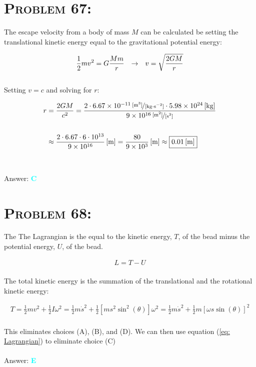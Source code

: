 \documentclass{article}
\providecommand{\e}[1]{\ensuremath{\times 10^{#1}}}
\begin{document}

\section{\textsc{Problem 67:}} The escape velocity from a body of mass $M$ can be calculated be setting the translational kinetic energy equal to the gravitational potential energy:

\begin{gather}
\frac{1}{2} m v^{2} = G \frac{Mm}{r} \hspace{.1in} \rightarrow \hspace{.1in} v = \sqrt{\frac{2GM}{r}}
\end{gather}
\\
Setting $v = c$ and solving for $r$:

\begin{align}
r &=  \frac{2GM}{c^{2}} = \frac{   2 \cdot \unitfrac[6.67\e{-11}]{[m^{3}]}{[kg \cdot s^{-2}]} \cdot \unit[5.98\e{24}]{[kg]} }{  \unitfrac[9\e{16}]{[m^{2}]}{[s^{2}]}   } \nonumber\\
\nonumber\\
&\approx \unit[  \frac{2 \cdot 6.67 \cdot 6 \cdot 10^{13}} {9\e{16}} ]  {[m]} = \unit[ \frac{80}{9\e{3}}   ]{[m]} \approx \boxed{\unit[  0.01  ]{[m]}}\nonumber
\end{align}
\\\\
Answer: \textbf{\textcolor{cyan}C}\\


\section{\textsc{Problem 68:}} The The Lagrangian is the equal to the kinetic energy, $T$, of the bead minus the potential energy, $U$, of the bead. 

\begin{gather}
\label {eq: Lagrangian}L = T-U
\end{gather}
\\
The total kinetic energy is the summation of the translational and the rotational kinetic energy:

\begin{gather}
T = \frac{1}{2}mv^{2} + \frac{1}{2}I \omega^{2} = \frac{1}{2}m \dot{s}^{2} + \frac{1}{2} \left[  m s^{2} \sin^{2}{(\theta)}  \right] \omega^{2} =  \frac{1}{2}m \dot{s}^{2} + \frac{1}{2} m  \left[\omega s \sin{(\theta)}   \right]^{2}\nonumber
\end{gather}
\\
This eliminates choices (A), (B), and (D). We can then use equation (\ref{eq: Lagrangian}) to eliminate choice (C) 
\\\\
Answer: \textbf{\textcolor{cyan}E}\\
\end{document}
